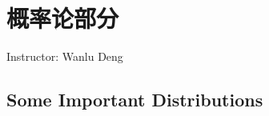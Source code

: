 
\section{概率论部分}\label{Section1Probability}
\begin{center}
    Instructor: Wanlu Deng
\end{center}


    












\subsection{Some Important Distributions}\label{SectionImportantDistributions}

